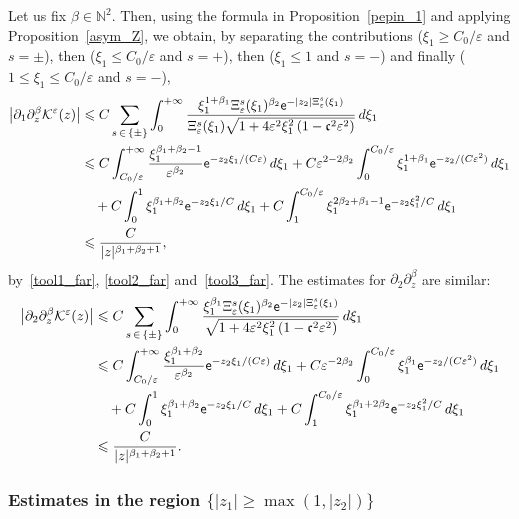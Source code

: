 \documentclass[AHL,Unicode,longabstracts,published]{cedram}
\newcommand*\p{\partial}
\newcommand*\N{\mathbb N}
\newcommand*\BK{\mathcal{K}}
\newcommand*\ex{{\sf e}}
\newcommand*\cs{{\mathfrak c}}
\newcommand*\ii{\infty}
\newcommand*\gs{\geqslant }
\newcommand*\ls{\leqslant }
\newcommand*\e{\varepsilon}
\begin{document}
Let us fix $ \beta \in \N^2 $. Then, using the formula in Proposition~\ref{pepin_1} and applying Proposition~\ref{asym_Z}, we obtain, by separating the contributions ($ \xi_1 \gs C_0 /\e $ and $s = \pm $), then ($ \xi_1 \ls C_0 /\e $ and $s = + $), then ($ \xi_1 \ls 1 $ and $s = - $) and finally ($ 1 \ls \xi_1 \ls C_0 /\e $ and $s = - $),
\begin{align*}
\left\lvert \p_1 \p_z^\beta \BK^\e (z) \right\rvert & \ls C \sum_{s\,\in\,\{ \pm \} } \int_{0}^{+\ii}
\frac{ \xi_1^{1+\beta_1} \Xi_\e^s (\xi_1)^{\beta_2} \ex^{- |z_2| \Xi_\e^s (\xi_1)} }{\Xi_\e^s (\xi_1) \sqrt{1 + 4\e^2 \xi_1^2\left(1 - \cs^2 \e^2\right)}} \, d\xi_1
\\ &
\ls C \int_{ C_0 /\e }^{+\ii} \frac{\xi_1^{\beta_1 + \beta_2 -1}}{\e^{\beta_2} }\ex^{- z_2 \xi_1/ (C \e)} \, d\xi_1 + C \e^{2 -2 \beta_2} \int_0^{ C_0 / \e } \xi_1^{1+\beta_1} \ex^{- z_2 / (C \e^2) } \, d\xi_1
\\ & \quad + C \int_0^{1} \xi_1^{\beta_1 +\beta_2} \ex^{- z_2 \xi_1 / C } \, d\xi_1 + C \int_1^{ C_0 / \e} \xi_1^{2\beta_2 + \beta_1 -1} \ex^{- z_2 \xi_1^2 / C } \, d\xi_1
\\ &
\ls \frac{C}{|z|^{\beta_1+\beta_2 +1}},
\end{align*}
by~\eqref{tool1_far}, \eqref{tool2_far} and~\eqref{tool3_far}. The estimates for $ \p_2 \p_z^\beta $ are similar:
\begin{align*}
\left\lvert \p_2 \p_z^\beta \BK^\e (z) \right\rvert & \ls C \sum_{s\,\in\,\{ \pm \} } \int_{0}^{+\ii}
\frac{ \xi_1^{\beta_1} \Xi_\e^s (\xi_1)^{\beta_2} \ex^{- |z_2| \Xi_\e^s (\xi_1)} }{ \sqrt{1 + 4\e^2 \xi_1^2\left(1 - \cs^2 \e^2\right) } } \, d\xi_1
\\ &
\ls C \int_{ C_0 /\e }^{+\ii} \frac{ \xi_1^{\beta_1 + \beta_2 } }{ \e^{\beta_2 } }
\ex^{- z_2 \xi_1/ (C \e)} \, d\xi_1 + C \e^{ -2 \beta_2} \int_0^{ C_0 / \e } \xi_1^{\beta_1} \ex^{- z_2 / (C \e^2) } \, d\xi_1
\\ & \quad + C \int_0^{1} \xi_1^{\beta_1 +\beta_2} \ex^{- z_2 \xi_1 / C } \, d\xi_1 + C \int_1^{ C_0 / \e} \xi_1^{\beta_1 + 2\beta_2 } \ex^{- z_2 \xi_1^2 / C } \, d\xi_1
\\ &
\ls \frac{C}{|z|^{\beta_1+\beta_2 +1}}.
\end{align*}



\subsubsection{Estimates in the region \texorpdfstring{$\{ |z_1 | \gs \max(1, |z_2|) \} $}{{ |z1 | gs max(1, |z2|) } }}
\end{document}
